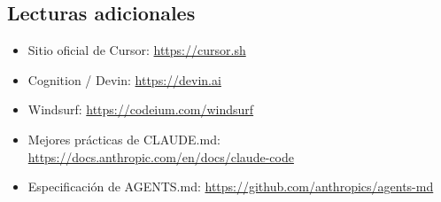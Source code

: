 \subsection{Lecturas adicionales}

\begin{itemize}
    \item Sitio oficial de Cursor: \url{https://cursor.sh}
    \item Cognition / Devin: \url{https://devin.ai}
    \item Windsurf: \url{https://codeium.com/windsurf}
    \item Mejores prácticas de CLAUDE.md: \url{https://docs.anthropic.com/en/docs/claude-code}
    \item Especificación de AGENTS.md: \url{https://github.com/anthropics/agents-md}
\end{itemize}



